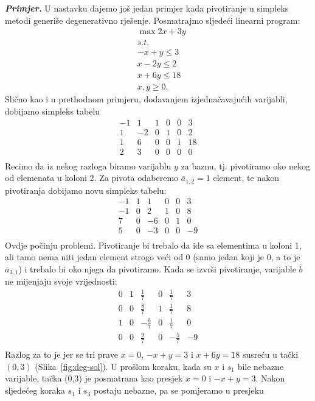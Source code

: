 \documentclass[a4paper, utf8, 11pt, colorlinks]{book}
\begin{document}
\emph{\textbf{Primjer.}} U nastavku dajemo još jedan primjer kada pivotiranje u simpleks metodi generiše degenerativno rješenje. 
Posmatrajmo sljedeći linearni program:
\begin{align*}
    &\max 2x + 3y \\
    & s.t. \\
	& -x + y \leq 3 \\
	& x - 2y \leq 2 \\
	& x + 6y \leq 18 \\
	& x,y \geq 0. 
\end{align*}
Slično kao i u prethodnom primjeru, dodavanjem izjednačavajućih varijabli, dobijamo simpleks 
tabelu 
$$\begin{array}{ccccc|c}
     -1 & 1 & 1 & 0 & 0 & 3 \\
      1 &-2 & 0 & 1 & 0 & 2 \\
      1 & 6 & 0 & 0 & 1 & 18 \\ \hline
      2 & 3 & 0 & 0 & 0 & 0 \\
\end{array}$$
Recimo da iz nekog razloga biramo varijablu $y$ za baznu, tj. pivotiramo oko nekog od elemenata u koloni 2. Za pivota odaberemo $\overline{a}_{1,2}=1$ element, te nakon pivotiranja dobijamo novu simpleks tabelu:
$$\begin{array}{ccccc|c}
	-1 & 1 & 1 & 0 & 0 & 3 \\
    -1 & 0 & 2 & 1 & 0 & 8 \\
    7 & 0 & -6 & 0 & 1 & 0 \\ \hline
    5 & 0 & -3 & 0 & 0 & -9 \\
\end{array}$$
Ovdje počinju problemi. Pivotiranje bi trebalo da ide sa elementima u koloni 1, ali tamo nema niti jedan element strogo veći od 0 (samo jedan koji je 0, a to je $\overline{a}_{3,1}$) i trebalo bi oko njega da pivotiramo. Kada se izvrši pivotiranje, varijable $\overline{b}$ ne mijenjaju svoje vrijednosti:
$$\begin{array}{ccccc|c}
     0 & 1 & \frac{1}{7}  & 0 & \frac{1}{7} & 3 \\
     0 & 0 & \frac{8}{7}  & 1 & \frac{1}{7} & 8 \\
     1 & 0 & -\frac{6}{7} & 0 & \frac{1}{7} & 0 \\ \hline
     0 & 0 & \frac{9}{7}  & 0 & -\frac{5}{7} & -9 \\
\end{array}$$
Razlog za to je jer se tri prave $x=0$, $-x+y=3$ i $x+6y=18$ susreću u tački $(0,3)$ (Slika~\ref{fig:deg-sol}). U prošlom koraku, kada su $x$ i $s_1$ bile nebazne varijable, tačka (0,3) je posmatrana kao presjek $x=0$ i $-x +y =3$. Nakon sljedećeg koraka $s_1$ i $s_3$ postaju nebazne, pa se pomjeramo u presjeku 
\end{document}
